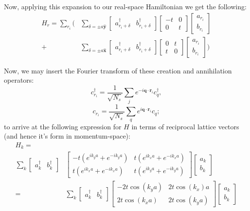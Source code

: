 \documentclass[10pt,a4paper]{article}\usepackage[]{graphicx}\usepackage[]{color}
\begin{document}
\begin{multicols}{2}
Now, applying this expansion to our real-space Hamiltonian we get the following:
\begin{align*}
H_{r} =\sum_{r_i}\Bigg( & \sum_{\delta = \pm a \hat{\mathbf{y}}}
\begin{bmatrix}
a^{\dagger}_{r_i+\delta} & b^{\dagger}_{r_i+\delta}
\end{bmatrix}
\begin{bmatrix}
-t & 0\\
0 & t
\end{bmatrix}
\begin{bmatrix}
a_{r_i} \\ b_{r_i}
\end{bmatrix}\\ 
+&
\sum_{\delta = \pm a \hat{\mathbf{x}}}
\begin{bmatrix}
a^{\dagger}_{r_i+\delta} & b^{\dagger}_{r_i+\delta}
\end{bmatrix}
\begin{bmatrix}
0 & t\\
t & 0
\end{bmatrix}
\begin{bmatrix}
a_{r_i} \\ b_{r_i}
\end{bmatrix}\Bigg)
\end{align*}

Now, we may insert the Fourier transform of these creation and annihilation operators:
$$
c^{\dagger}_{r_i} = \frac{1}{\sqrt{N_s}}\sum_j e^{-i\mathbf{q}\cdot\mathbf{r}_i}c_{q}^{\dagger},
$$
$$
c_{r_i} = \frac{1}{\sqrt{N_s}}\sum_q e^{i\mathbf{q}\cdot\mathbf{r}_i}c_{q};
$$
to arrive at the following expression for $H$ in terms of reciprocal lattice vectors (and hence it's form in momentum-space):
\small
\begin{align*}
H_k =& \\
\sum_{k}
\begin{bmatrix}
a^{\dagger}_{k} & b^{\dagger}_{k}
\end{bmatrix}&
\begin{bmatrix}
-t(e^{ik_y a}+e^{-ik_y a}) & t(e^{ik_x a}+e^{-ik_x a})\\
t(e^{ik_x a}+e^{-ik_x a}) & t(e^{ik_y a}+e^{-ik_y a})
\end{bmatrix}
\begin{bmatrix}
a_{k} \\ b_{k}
\end{bmatrix}\\
= &\sum_{k}
\begin{bmatrix}
a^{\dagger}_{k} & b^{\dagger}_{k}
\end{bmatrix}\begin{bmatrix}
-2t\cos(k_y a) & 2t\cos(k_x) a\\
2t\cos(k_x a) & 2t\cos(k_y a)
\end{bmatrix}
\begin{bmatrix}
a_{k} \\ b_{k}
\end{bmatrix}
\end{align*}
\normalsize


\end{multicols}
\end{document}
